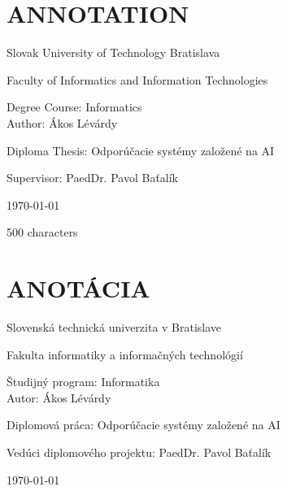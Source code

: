 \documentclass[\myFontSize,oneside,english,hidelinks,a4paper]{article}
\newcommand{\thesisTitle}[0] {Odporúčacie systémy založené na AI}
\begin{document}
\titleformat{\section}{\LARGE\bfseries}{\thesection}{1em}{}
\titleformat{\subsection}{\Large\bfseries}{\thesubsection}{1em}{}
\titleformat{\subsubsection}{\Large\bfseries}{\thesubsubsection}{1em}{}

%
%

\newpage{}
\thispagestyle{empty}
\mbox{}

\newpage{} 
\thispagestyle{empty}
\section*{ANNOTATION}
\begin{minipage}[t]{1\columnwidth}%
Slovak University of Technology Bratislava 

Faculty of Informatics and Information Technologies

Degree Course: Informatics\\

Author: Ákos Lévárdy

Diploma Thesis: \thesisTitle

Supervisor: PaedDr. Pavol Baťalík

\today%
\end{minipage}
\bigskip{}

500 characters


\newpage{}
\thispagestyle{empty}
\mbox{}

\newpage{}
\thispagestyle{empty}
\section*{ANOTÁCIA}
\begin{minipage}[t]{1\columnwidth}%
Slovenská technická univerzita v Bratislave

Fakulta informatiky a informačných technológií

Študijný program: Informatika\\

Autor: Ákos Lévárdy

Diplomová práca: \thesisTitle

Vedúci diplomového projektu: PaedDr. Pavol Baťalík

\today%
\end{minipage}
\bigskip{}
\end{document}
